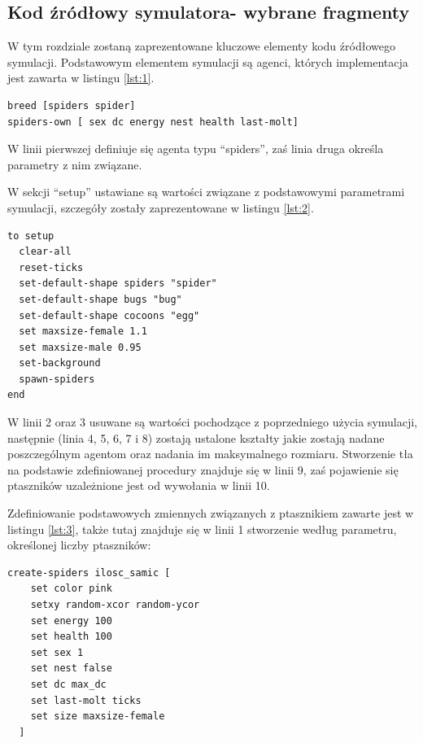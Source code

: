 \documentclass[a4paper,11pt,titlepage]{article}
\begin{document}
\subsection{Kod źródłowy symulatora- wybrane fragmenty}
W tym rozdziale zostaną zaprezentowane kluczowe elementy kodu źródłowego symulacji. Podstawowym elementem symulacji są agenci, których implementacja jest zawarta w listingu \ref{lst:1}. 

\begin{lstlisting}[language=HTML, caption=Implementacja agenta w środowisku NetLogo, label={lst:1}]
breed [spiders spider]
spiders-own [ sex dc energy nest health last-molt]
\end{lstlisting}

\noindent W linii pierwszej definiuje się agenta typu “spiders”, zaś linia druga określa parametry z nim związane.  

W sekcji “setup” ustawiane są wartości związane z podstawowymi parametrami symulacji, szczegóły zostały zaprezentowane w listingu \ref{lst:2}. 

\begin{lstlisting}[language=HTML, caption=Ustalanie podstawowych parametrów symulacji. , label={lst:2}]
to setup
  clear-all
  reset-ticks
  set-default-shape spiders "spider"
  set-default-shape bugs "bug"
  set-default-shape cocoons "egg"
  set maxsize-female 1.1
  set maxsize-male 0.95
  set-background
  spawn-spiders
end
\end{lstlisting}

\noindent W linii 2 oraz 3 usuwane są wartości pochodzące z poprzedniego użycia symulacji, następnie (linia 4, 5, 6, 7 i 8) zostają ustalone kształty jakie zostają nadane poszczególnym agentom oraz nadania im maksymalnego rozmiaru. Stworzenie tła na podstawie zdefiniowanej procedury znajduje się w linii 9, zaś pojawienie się ptaszników uzależnione jest od wywołania w linii 10. 

Zdefiniowanie podstawowych zmiennych związanych z ptasznikiem zawarte jest w listingu \ref{lst:3}, także tutaj znajduje się w linii 1 stworzenie według parametru, określonej liczby ptaszników: 

\begin{lstlisting}[language=HTML, caption=Metoda odpowiadająca za tworzenie obiektu typu ``ptasznik samica''., label={lst:3}]
create-spiders ilosc_samic [
    set color pink
    setxy random-xcor random-ycor
    set energy 100
    set health 100
    set sex 1
    set nest false
    set dc max_dc
    set last-molt ticks
    set size maxsize-female
  ]
\end{lstlisting}
\end{document}
